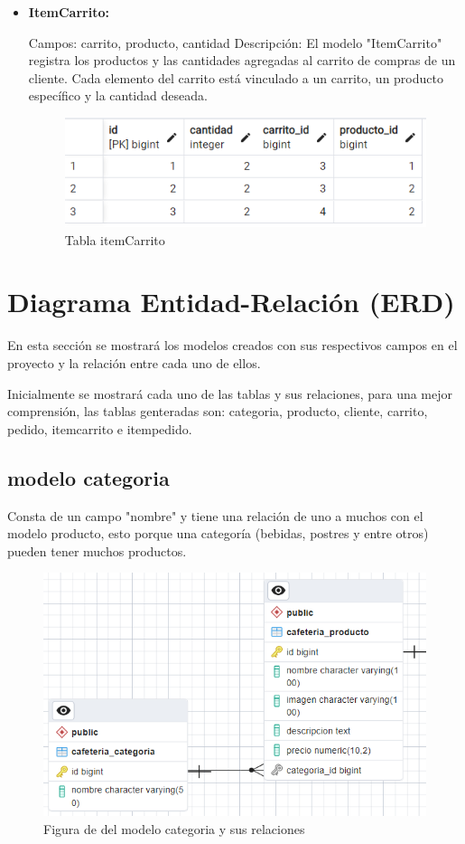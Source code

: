 \documentclass{article}
\begin{document}
\begin{itemize}
		\item \textbf{ItemCarrito:}
		
	Campos: carrito, producto, cantidad
	Descripción: El modelo "ItemCarrito" registra los productos y las cantidades agregadas al carrito de compras de un cliente. Cada elemento del carrito está vinculado a un carrito, un producto específico y la cantidad deseada.
	\begin{figure}[h!]
		\centering
		\includegraphics[width=1\linewidth]{img/titemcarrito}
		\caption{Tabla itemCarrito}
		\label{fig:titemcarrito}
	\end{figure}
	
	\end{itemize}
		
	\section{Diagrama Entidad-Relación (ERD)}
	En esta sección se mostrará los modelos creados con sus respectivos campos en el proyecto y la relación entre cada uno de ellos.
	
	Inicialmente se mostrará cada uno de las tablas y sus relaciones, para una mejor comprensión, las tablas genteradas son: categoria, producto, cliente, carrito, pedido, itemcarrito e itempedido.
	
	\subsection{modelo categoria}
	Consta de un campo "nombre" y tiene una relación de uno a muchos con el modelo producto, esto porque una categoría (bebidas, postres y entre otros) pueden tener muchos productos.
	\begin{figure}[h!]
		\centering
		\includegraphics[width=1\linewidth]{img/modCategoria}
		\caption{Figura de del modelo categoria y sus relaciones}
		\label{fig:modcategoria}
	\end{figure}
	
\end{document}
